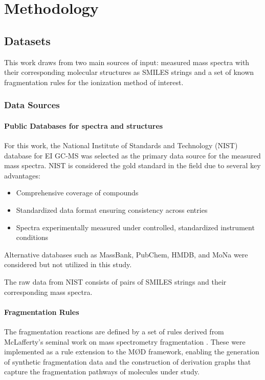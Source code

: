 \chapter{Methodology}
\label{ch:3}
\noindent

\section{Datasets}

This work draws from two main sources of input: 
measured mass spectra with their corresponding molecular structures as SMILES strings and a set of known fragmentation rules for the ionization method of interest.

\subsection{Data Sources}

\subsubsection{Public Databases for spectra and structures}

For this work, the National Institute of Standards and Technology (NIST) database for EI GC-MS was selected as the primary data source for the measured mass spectra. 
NIST is considered the gold standard in the field due to several key advantages: \cite[p.~3]{Wallace2023}

\begin{itemize}
    \item Comprehensive coverage of compounds
    \item Standardized data format ensuring consistency across entries
    \item Spectra experimentally measured under controlled, standardized instrument conditions 
\end{itemize}

Alternative databases such as MassBank, PubChem, HMDB, and MoNa were considered but not utilized in this study.

The raw data from NIST consists of pairs of SMILES strings and their corresponding mass spectra.

\subsubsection{Fragmentation Rules}

The fragmentation reactions are defined by a set of rules derived from McLafferty's seminal work on mass spectrometry fragmentation \cite{McLafferty1993}. 
These were implemented as a rule extension to the M\O D framework, enabling the generation of synthetic fragmentation data and the construction of derivation graphs that capture the fragmentation pathways of molecules under study.

